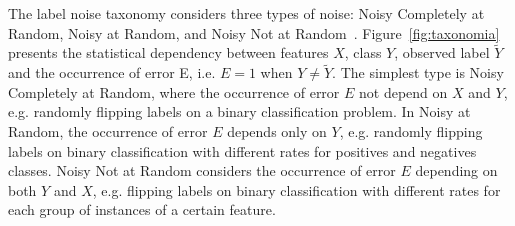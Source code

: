 The label noise taxonomy considers three types of noise: Noisy Completely at Random, Noisy at Random, and Noisy Not at Random~\citep{Frenay2014}. Figure~\ref{fig:taxonomia} presents the statistical dependency between features $X$, class $Y$, observed label $\tilde{Y}$ and the occurrence of error E, i.e. $E=1$ when $Y \neq \tilde{Y}$. The simplest type is Noisy Completely at Random, where the occurrence of error $E$ not depend on $X$ and $Y$, e.g. randomly flipping labels on a binary classification problem. In Noisy at Random, the occurrence of error $E$ depends only on $Y$, e.g. randomly flipping labels on binary classification with different rates for positives and negatives classes. Noisy Not at Random considers the occurrence of error $E$ depending on both $Y$ and $X$, e.g. flipping labels on binary classification with different rates for each group of instances of a certain feature.


